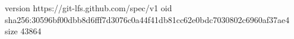 version https://git-lfs.github.com/spec/v1
oid sha256:30596bf00dbb8d6fff7d3076c0a44f41db81cc62e0bdc7030802c6960af37ae4
size 43864
